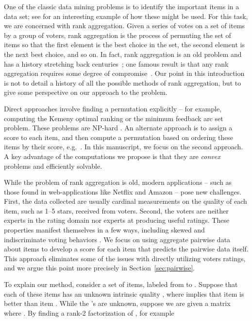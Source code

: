 \documentclass{sig-alternate}
\renewcommand{\cite}{\citep}
\begin{document}
One of the classic data mining problems is to identify the
important items in a data set; see \citet{Tan-2004-ordering}
for an interesting example of how these might be used. For this task, 
we are concerned with rank aggregation.
Given a series of votes on a set of items by a group of voters,
rank aggregation is the process of permuting the set of items so that
the first element is the best choice in the set, the second
element is the next best choice, and so on.  
In fact, rank aggregation is an old problem and has a history stretching 
back centuries~\cite{condorcet1785-essai}; one famous 
result is that any rank aggregation requires some 
degree of compromise~\cite{arrow1950-impossibility}.  
Our point in this introduction
is not to detail a history of all the possible methods of
rank aggregation, but to give some perspective on our approach to
the problem.

Direct approaches involve finding a permutation
explicitly -- for example, computing the Kemeny optimal
ranking \cite{kemeny1959-math-without-numbers} or
the minimum feedback arc set problem.  
These problems are NP-hard 
\cite{dwork2001-rank-aggregation,ailon2005-ranking,alon2006-ranking}.
An alternate approach is to assign a score to 
each item, and then compute a permutation based on
ordering these items by their score, e.g.\ \citet{saaty1987-perron}.
In this manuscript, we focus on the second approach.  A
key advantage of the computations we propose
is that they are \emph{convex} problems and efficiently
solvable.

While
the problem of rank aggregation is old, modern applications --
such as those found in web-applications like Netflix and Amazon --
pose new challenges. 
First, the data collected are usually
cardinal measurements on the quality of each
item, such as  1--5 stars, received from voters.
Second, the voters are neither experts in the rating domain nor
experts at producing useful ratings.  These properties
manifest themselves in a few ways, including skewed
and indiscriminate voting behaviors \cite{ho2008-ratings}.
We focus on using aggregate pairwise 
data about items to develop a score for each item that
predicts the pairwise data itself.  This approach
eliminates some of the issues with directly utilizing
voters ratings, and we argue this point more precisely
in Section~\ref{sec:pairwise}.





To explain our method, consider a set of  items, labeled from  to .  
Suppose that each of these
items has an unknown intrinsic quality ,
where  implies that item  is better
than item .  While the 's are unknown, 
suppose we are given
a matrix  where .  By 
finding a rank-2 factorization of , for example
\end{document}
